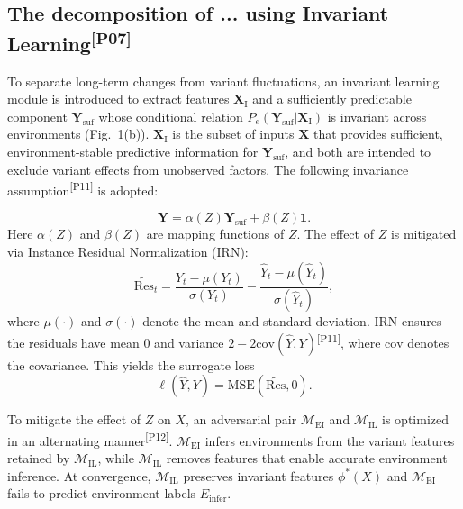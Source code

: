 ﻿\documentclass[journal]{IEEEtran}
\DeclareRobustCommand{\auditbad}[2]{{\color{auditred}#1}{\color{auditred}\textsuperscript{[#2]}}}
\begin{document}
\subsection{\auditbad{The decomposition of ... using Invariant Learning}{P07}}
To separate long-term changes from variant fluctuations, an invariant learning module is introduced to extract features $\mathbf{X}_{\mathrm{I}}$ and a sufficiently predictable component $\mathbf{Y}_{\mathrm{suf}}$ whose conditional relation $P_e(\mathbf{Y}_{\mathrm{suf}}|\mathbf{X}_{\mathrm{I}})$ is invariant across environments (Fig.~1(b)). $\mathbf{X}_{\mathrm{I}}$ is the subset of inputs $\mathbf{X}$ that provides sufficient, environment-stable predictive information for $\mathbf{Y}_{\mathrm{suf}}$, and both are intended to exclude variant effects from unobserved factors. The following \auditbad{invariance assumption}{P11} is adopted:

\begin{equation}
\mathbf{Y}=\alpha(Z)\mathbf{Y}_{\mathrm{suf}}+\beta(Z) \mathbf{1}.
\end{equation}
Here $\alpha(Z)$ and $\beta(Z)$ are mapping functions of $Z$. The effect of $Z$ is mitigated via Instance Residual Normalization (IRN):
\begin{equation}
\tilde{\mathrm{Res}}_t=\frac{Y_t-\mu(Y_t)}{\sigma(Y_t)}-\frac{\widehat{Y}_t-\mu(\widehat{Y}_t)}{\sigma(\widehat{Y}_t)},
\end{equation}
where $\mu(\cdot)$ and $\sigma(\cdot)$ denote the mean and standard deviation. \auditbad{IRN ensures the residuals have mean 0 and variance $2-2\mathrm{cov}(\widehat{Y},Y)$}{P11}, where $\mathrm{cov}$ denotes the covariance. This yields the surrogate loss
\begin{equation}
\ell(\widehat{Y},Y)=\mathrm{MSE}(\tilde{\mathrm{Res}},0).
\end{equation}

To mitigate the effect of $Z$ on $X$, \auditbad{an adversarial pair $\mathcal{M}_{\mathrm{EI}}$ and $\mathcal{M}_{\mathrm{IL}}$ is optimized in an alternating manner}{P12}. $\mathcal{M}_{\mathrm{EI}}$ infers environments from the variant features retained by $\mathcal{M}_{\mathrm{IL}}$, while $\mathcal{M}_{\mathrm{IL}}$ removes features that enable accurate environment inference. At convergence, $\mathcal{M}_{\mathrm{IL}}$ preserves invariant features $\phi^{*}(X)$ and $\mathcal{M}_{\mathrm{EI}}$ fails to predict environment labels $E_{\mathrm{infer}}$. 
\end{document}
